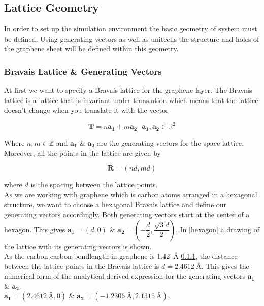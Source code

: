 \subsection{Lattice Geometry}

In order to set up the simulation environment the basic geometry of system must be defined. Using generating vectors as well as unitcells the structure and holes of the graphene sheet will be defined within this geometry. 

\subsubsection{Bravais Lattice \& Generating Vectors}
At first we want to specify a Bravais lattice for the graphene-layer. The Bravais lattice is a lattice that is invariant under translation which means that the lattice doesn't change when you translate it with the vector 

\begin{equation}
    \mathbf{T}=n\mathbf{a_{1}}+m\mathbf{a_{2}}\ \ \ \mathbf{a_{1}},\mathbf{a_{2}} \in \mathbb{R}^{2} 
\end{equation}

Where $n,m \in \mathbb{Z}$ and $\mathbf{a_{1}}$ \& $\mathbf{a_{2}}$ are the generating vectors for the space lattice. Moreover, all the points in the lattice are given by 

\begin{equation}
    \mathbf{R}=(nd,md) 
\end{equation}

where $d$ is the spacing between the lattice points. \\
As we are working with graphene which is carbon atoms arranged in a hexagonal structure, we want to choose a hexagonal Bravais lattice and define our generating vectors accordingly. Both generating vectors start at the center of a hexagon. This gives $\mathbf{a_{1}}=(d,0)$ \& $\mathbf{a_{2}}=\left(-\dfrac{d}{2},\dfrac{\sqrt{3}d}{2}\right)$. In \cref{hexagon} a drawing of the lattice with its generating vectors is shown.\\ 
As the carbon-carbon bondlength in graphene is \SI{1.42}{\angstrom} \cref{}, the distance between the lattice points  in the Bravais lattice is $d=\SI{2.4612}{\angstrom}$. This gives the numerical form of the analytical derived expression for the generating vectors  $\mathbf{a_{1}}$ \& $\mathbf{a_{2}}$. \\
$\mathbf{a_{1}}=(\SI{2.4612}{\angstrom},0)$ \& $\mathbf{a_{2}}=\left(-\SI{1.2306}{\angstrom},\SI{2.1315}{\angstrom}\right)$. 


